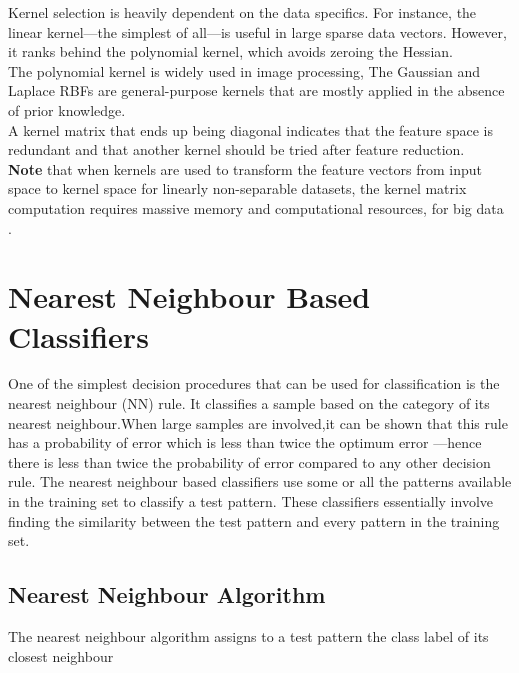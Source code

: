Kernel selection is heavily dependent on the data specifics. For instance, the linear kernel—the simplest
of all—is useful in large sparse data vectors. However, it ranks behind the polynomial kernel, which avoids
zeroing the Hessian. \\The polynomial kernel is widely used in image processing, The Gaussian and Laplace RBFs are general-purpose kernels that are mostly applied in the absence of prior knowledge. \\A kernel matrix that ends up being diagonal indicates that the feature space is redundant and that another kernel should be tried after feature reduction.\\\textbf{
Note} that when kernels are used to transform the feature vectors from input space to kernel space for linearly non-separable datasets, the kernel matrix computation requires massive memory and computational
resources, for big data . 



\section{Nearest Neighbour Based Classifiers}

One of the simplest decision procedures that can be used for classification is the
nearest neighbour (NN) rule. It classifies a sample based on the category of its nearest
neighbour.When large samples are involved,it can be shown that this rule has a
probability of error which is less than twice the optimum error
—hence there is less
than twice the probability of error compared to any other decision rule. The nearest
neighbour based classifiers use some or all the patterns available in the training set
to classify a test pattern. These classifiers essentially involve finding the similarity
between the test pattern and every pattern in the training set.

\subsection{Nearest Neighbour Algorithm}
The nearest neighbour algorithm assigns to a test pattern the class label of its closest
neighbour


